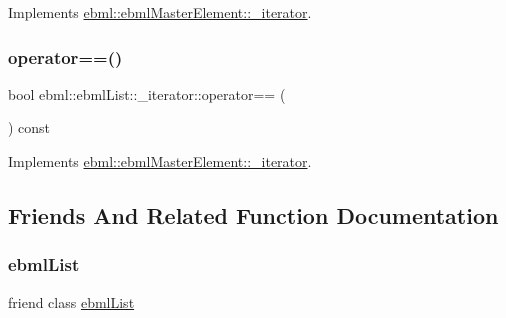 Implements \mbox{\hyperlink{classebml_1_1ebmlMasterElement_1_1__iterator_a849c5027957fa1a022de0417aea1ad9e}{ebml\+::ebml\+Master\+Element\+::\+\_\+iterator}}.

\mbox{\label{classebml_1_1ebmlList_1_1__iterator_af451e7598220ae323edd778f4ca3ab21}} 
\subsubsection{\texorpdfstring{operator==()}{operator==()}}
{\footnotesize\ttfamily bool ebml\+::ebml\+List\+::\+\_\+iterator\+::operator== (\begin{DoxyParamCaption}\item[{const \mbox{\hyperlink{classebml_1_1ebmlMasterElement_1_1__iterator}{ebml\+Master\+Element\+::\+\_\+iterator}} \&}]{ }\end{DoxyParamCaption}) const\hspace{0.3cm}{\ttfamily [virtual]}}



Implements \mbox{\hyperlink{classebml_1_1ebmlMasterElement_1_1__iterator_ab0b53665f686e2ae379b275110ea3c95}{ebml\+::ebml\+Master\+Element\+::\+\_\+iterator}}.



\subsection{Friends And Related Function Documentation}
\mbox{\label{classebml_1_1ebmlList_1_1__iterator_af371b14231393d2eef62cb562cdd6e2d}} 
\subsubsection{\texorpdfstring{ebml\+List}{ebmlList}}
{\footnotesize\ttfamily friend class \mbox{\hyperlink{classebml_1_1ebmlList}{ebml\+List}}\hspace{0.3cm}{\ttfamily [friend]}}

